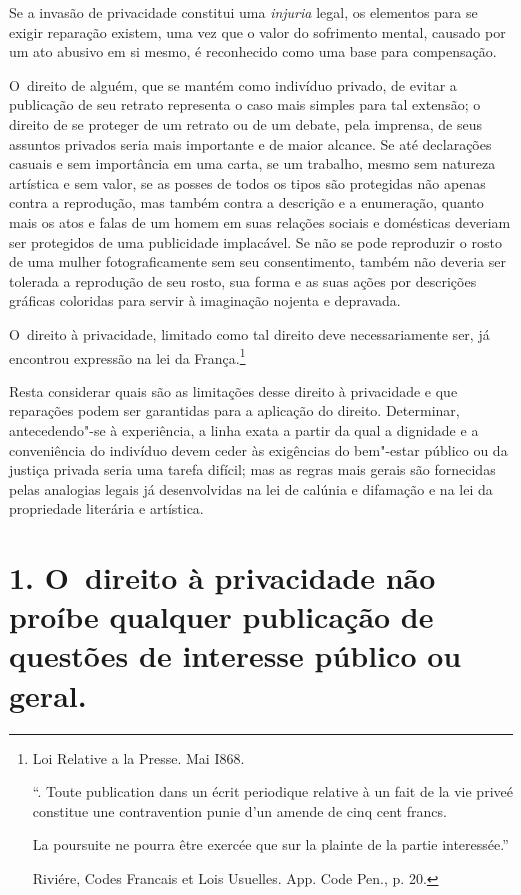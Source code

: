 Se a invasão de privacidade constitui uma \emph{injuria} legal, os
elementos para se exigir reparação existem, uma vez que o valor do
sofrimento mental, causado por um ato abusivo em si mesmo, é reconhecido
como uma base para compensação.

O~direito de alguém, que se mantém como indivíduo privado, de evitar a
publicação de seu retrato representa o caso mais simples para tal
extensão; o direito de se proteger de um retrato ou de um debate, pela
imprensa, de seus assuntos privados seria mais importante e de maior
alcance. Se até declarações casuais e sem importância em uma carta, se
um trabalho, mesmo sem natureza artística e sem valor, se as posses de
todos os tipos são protegidas não apenas contra a reprodução, mas também
contra a descrição e a enumeração, quanto mais os atos e falas de um
homem em suas relações sociais e domésticas deveriam ser protegidos de
uma publicidade implacável. Se não se pode reproduzir o rosto de uma
mulher fotograficamente sem seu consentimento, também não deveria ser
tolerada a reprodução de seu rosto, sua forma e as suas ações por
descrições gráficas coloridas para servir à imaginação nojenta e
depravada.

O~direito à privacidade, limitado como tal direito deve necessariamente
ser, já encontrou expressão na lei da França.\footnote{Loi Relative a la
  Presse.  Mai I868.

  ``. Toute publication dans un écrit periodique relative à un fait de
      la vie priveé constitue une contravention punie d'un amende de cinq
      cent francs.
    
      La poursuite ne pourra être exercée que sur la plainte de la partie
      interessée.''

  Riviére, Codes Francais et Lois Usuelles. App. Code Pen., p. 20.}

Resta considerar quais são as limitações desse direito à privacidade e
que reparações podem ser garantidas para a aplicação do direito.
Determinar, antecedendo"-se à experiência, a linha exata a partir da qual
a dignidade e a conveniência do indivíduo devem ceder às exigências do
bem"-estar público ou da justiça privada seria uma tarefa difícil; mas as
regras mais gerais são fornecidas pelas analogias legais já
desenvolvidas na lei de calúnia e difamação e na lei da propriedade
literária e artística.

\section{1. O~direito à privacidade não proíbe qualquer publicação de
  questões de interesse público ou geral.}

